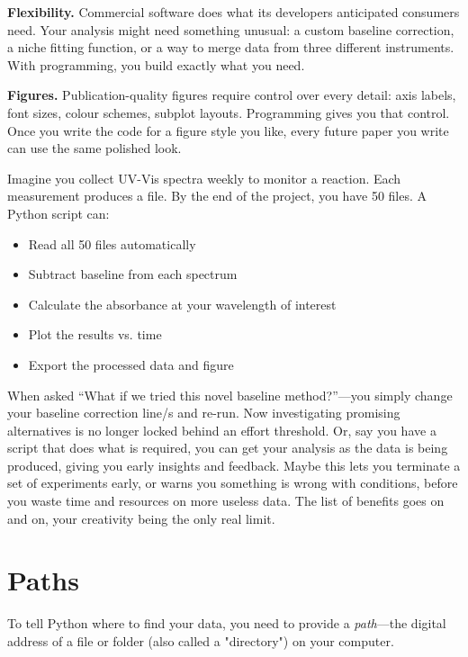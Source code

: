 \textbf{Flexibility.} Commercial software does what its developers anticipated consumers need. Your analysis might need something unusual: a custom baseline correction, a niche fitting function, or a way to merge data from three different instruments. With programming, you build exactly what you need.

\textbf{Figures.} Publication-quality figures require control over every detail: axis labels, font sizes, colour schemes, subplot layouts. Programming gives you that control. Once you write the code for a figure style you like, every future paper you write can use the same polished look.

\begin{labexample}
Imagine you collect UV-Vis spectra weekly to monitor a reaction. Each measurement produces a file. By the end of the project, you have 50 files. A Python script can:
\begin{itemize}
    \item Read all 50 files automatically
    \item Subtract baseline from each spectrum
    \item Calculate the absorbance at your wavelength of interest
    \item Plot the results vs. time
    \item Export the processed data and figure
\end{itemize}
When asked ``What if we tried this novel baseline method?''---you simply change your baseline correction line/s and re-run. Now investigating promising alternatives is no longer locked behind an effort threshold. Or, say you have a script that does what is required, you can get your analysis as the data is being produced, giving you early insights and feedback. Maybe this lets you terminate a set of experiments early, or warns you something is wrong with conditions, before you waste time and resources on more useless data. The list of benefits goes on and on, your creativity being the only real limit.
\end{labexample}

\section{Paths}
\label{sec:paths}

To tell Python where to find your data, you need to provide a \emph{path}---the digital address of a file or folder (also called a "directory") on your computer. 

